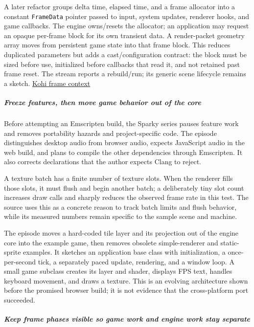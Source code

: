 A later refactor groups delta time, elapsed time, and a frame allocator into a constant \texttt{FrameData} pointer passed to input, system updates, renderer hooks, and game callbacks. The engine owns/resets the allocator; an application may request an opaque per-frame block for its own transient data. A render-packet geometry array moves from persistent game state into that frame block. This reduces duplicated parameters but adds a cast/configuration contract: the block must be sized before use, initialized before callbacks that read it, and not retained past frame reset. The stream reports a rebuild/run; its generic scene lifecycle remains a sketch. \href{https://www.youtube.com/watch?v=xRag4sy8Kyk}{Kohi frame context}

\subparagraph{Freeze features, then move game behavior out of the core}\label{freeze-features-then-move-game-behavior-out-of-the-core}

Before attempting an Emscripten build, the Sparky series pauses feature work and removes portability hazards and project-specific code. The episode distinguishes desktop audio from browser audio, expects JavaScript audio in the web build, and plans to compile the other dependencies through Emscripten. It also corrects declarations that the author expects Clang to reject.

A texture batch has a finite number of texture slots. When the renderer fills those slots, it must flush and begin another batch; a deliberately tiny slot count increases draw calls and sharply reduces the observed frame rate in this test. The source uses this as a concrete reason to track batch limits and flush behavior, while its measured numbers remain specific to the sample scene and machine.

The episode moves a hard-coded tile layer and its projection out of the engine core into the example game, then removes obsolete simple-renderer and static-sprite examples. It sketches an application base class with initialization, a once-per-second tick, a separately paced update, rendering, and a window loop. A small game subclass creates its layer and shader, displays FPS text, handles keyboard movement, and draws a texture. This is an evolving architecture shown before the promised browser build; it is not evidence that the cross-platform port succeeded.

\subparagraph{Keep frame phases visible so game work and engine work stay separate}\label{keep-frame-phases-visible-so-game-work-and-engine-work-stay-separate}

